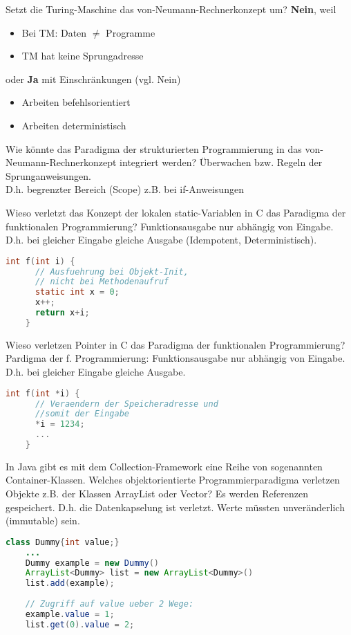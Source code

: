 \begin{card}
	Setzt die Turing-Maschine das von-Neumann-Rechnerkonzept um?
	\hr
	\textbf{Nein}, weil
	\begin{itemize}
	\item Bei TM: Daten $\neq$ Programme
	\item TM hat keine Sprungadresse
	\end{itemize}
	\vfill
	oder \textbf{Ja} mit Einschränkungen (vgl. Nein)
	\begin{itemize}
	\item Arbeiten befehlsorientiert
	\item Arbeiten deterministisch
	\end{itemize}
\end{card}

\begin{card}
	Wie könnte das Paradigma der strukturierten Programmierung in das von-Neumann-Rechnerkonzept integriert werden?
	\hr
	Überwachen bzw. Regeln der Sprunganweisungen.\\
	D.h. begrenzter Bereich (Scope) z.B. bei if-Anweisungen
\end{card}

\begin{card}
	Wieso verletzt das Konzept der lokalen static-Variablen in C das Paradigma der funktionalen
	Programmierung?
	\hr
	Funktionsausgabe nur abhängig von Eingabe. D.h. bei gleicher Eingabe gleiche Ausgabe (Idempotent, Deterministisch).
	\begin{lstlisting}[language=C]
	int f(int i) {
	  // Ausfuehrung bei Objekt-Init, 
	  // nicht bei Methodenaufruf
	  static int x = 0; 
	  x++;
	  return x+i;
	}
	\end{lstlisting}	
\end{card}

\begin{card}
	Wieso verletzen Pointer in C das Paradigma der funktionalen Programmierung?
	\hr
	Pardigma der f. Programmierung: Funktionsausgabe nur abhängig von Eingabe.  D.h. bei gleicher Eingabe gleiche Ausgabe.
	\begin{lstlisting}[language=C]
	int f(int *i) {
	  // Veraendern der Speicheradresse und 
	  //somit der Eingabe
	  *i = 1234;
	  ...
	}
	\end{lstlisting}	
\end{card}

\begin{card}
	In Java gibt es mit dem Collection-Framework eine Reihe von sogenannten Container-Klassen. Welches objektorientierte Programmierparadigma verletzen Objekte z.B. der Klassen	ArrayList oder Vector? 
	\hr
	Es werden Referenzen gespeichert. D.h. die Datenkapselung ist verletzt. Werte müssten unveränderlich (immutable) sein.
	\begin{lstlisting}[language=Java]
	class Dummy{int value;}
	...
	Dummy example = new Dummy()
	ArrayList<Dummy> list = new ArrayList<Dummy>()
	list.add(example);
	
	// Zugriff auf value ueber 2 Wege:
	example.value = 1;
	list.get(0).value = 2;
	\end{lstlisting}	
\end{card}

